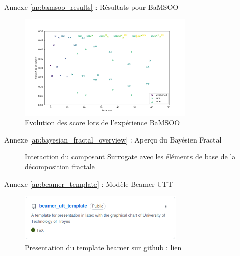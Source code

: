 \begin{frame}{Annexe \ref{ap:bamsoo_results} : Résultats pour BaMSOO}
    \label{ap:bamsoo_results}
    \begin{figure}
        \centering
        \includegraphics[height = 5cm]{assets/imgs/plots/bamsoo/score_evolution.png}
        \caption{Evolution des score lors de l'expérience BaMSOO}
    \end{figure} 
\end{frame}

\begin{frame}{Annexe \ref{ap:bayesian_fractal_overview} : Aperçu du Bayésien Fractal}
    \label{ap:bayesian_fractal_overview}
    \begin{figure}
        \centering
        
        \caption{Interaction du composant Surrogate avec les éléments de base de la décomposition fractale}
    \end{figure}
\end{frame}

\begin{frame}{Annexe \ref{ap:beamer_template} : Modèle Beamer UTT}
    \label{ap:beamer_template}
    \begin{figure}
        \centering
        \includegraphics[width = 0.7\textwidth]{assets/annexes/beamer_gh_screenshot.png}
        \caption{Presentation du template beamer sur github : \href{https://github.com/Kiwy3/beamer_utt_template}{lien} }
    \end{figure} 
\end{frame}